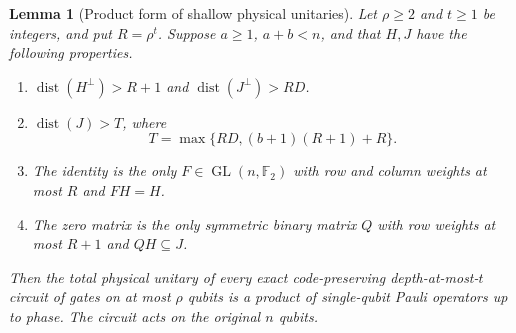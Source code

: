 \documentclass[aps,prl,reprint,notitlepage,nofootinbib,nobibnotes]{revtex4-2}
\newtheorem{lemma}{Lemma}
\begin{document}
\begin{lemma}[Product form of shallow physical unitaries]
\label{em:upper-rigidity}
Let $\rho\ge2$ and $t\ge1$ be integers, and put $R=\rho^t$. Suppose $a\ge1$, $a+b<n$, and that
$H,J$ have the following properties.
\begin{enumerate}
\item $\operatorname{dist}(H^\perp)>R+1$ and
  $\operatorname{dist}(J^\perp)>RD$.
\item $\operatorname{dist}(J)>T$, where
\begin{equation}\label{em:upper-deletion}
 T=\max\{RD,(b+1)(R+1)+R\}.
\end{equation}
\item The identity is the only $F\in\operatorname{GL}(n,\mathbb F_2)$ with row and column weights
at most $R$ and $FH=H$.
\item The zero matrix is the only symmetric binary matrix $Q$ with row weights at most $R+1$ and
$QH\subseteq J$.
\end{enumerate}
Then the total physical unitary of every exact code-preserving depth-at-most-$t$ circuit of gates
on at most $\rho$ qubits is a product of single-qubit Pauli operators up to phase. The circuit acts
on the original $n$ qubits.
\end{lemma}
\end{document}
